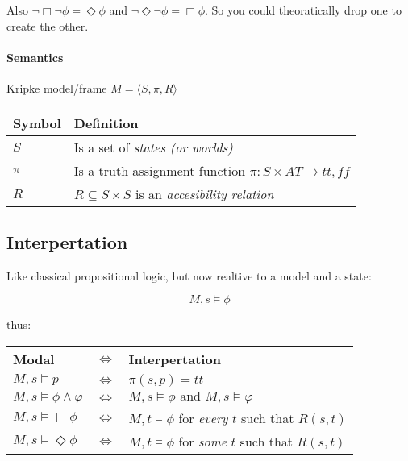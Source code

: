 \documentclass{article}
\begin{document}
\noindent
Also $\neg\Box\neg\phi = \Diamond\phi$ and
$\neg\Diamond\neg\phi = \Box\phi$. So you could theoratically
drop one to create the other.

\paragraph{Semantics} Kripke %
model/frame $M=\langle S,\pi,R \rangle$

\begin{tabular}{ll}
	Symbol & Definition \\ \toprule
	$S$ & Is a set of \emph{states (or worlds)} \\
	$\pi$ & Is a truth assignment function $\pi : S \times AT \to {tt, ff}$ \\
	$R$	& $R \subseteq S \times S$ is an \emph{accesibility relation}\\
\end{tabular}

\subsection{Interpertation}

\begin{center}
\end{center}

Like classical propositional logic, but now realtive to a model and a state:

\[ M,s \vDash \phi \]

thus:

\begin{tabular}{lll}
	Modal & $\Leftrightarrow$ & Interpertation \\ \toprule
$M,s \vDash p$ & $\Leftrightarrow$ & $\pi(s,p) = tt$ \\
$M,s \vDash \phi \wedge \varphi $ & $\Leftrightarrow$ & $ M,s \vDash \phi
\mbox{ and }M,s\vDash \varphi$ \\
$M,s \vDash \Box \phi $ & $\Leftrightarrow$ & $ M,t \vDash \phi $ for 
\emph{every} $t$ such that $R(s,t)$ \\
$M,s \vDash \Diamond \phi $ & $\Leftrightarrow$ & $ M,t \vDash \phi $ for 
\emph{some} $t$ such that $R(s,t)$ \\\bottomrule
\end{tabular}
\end{document}
